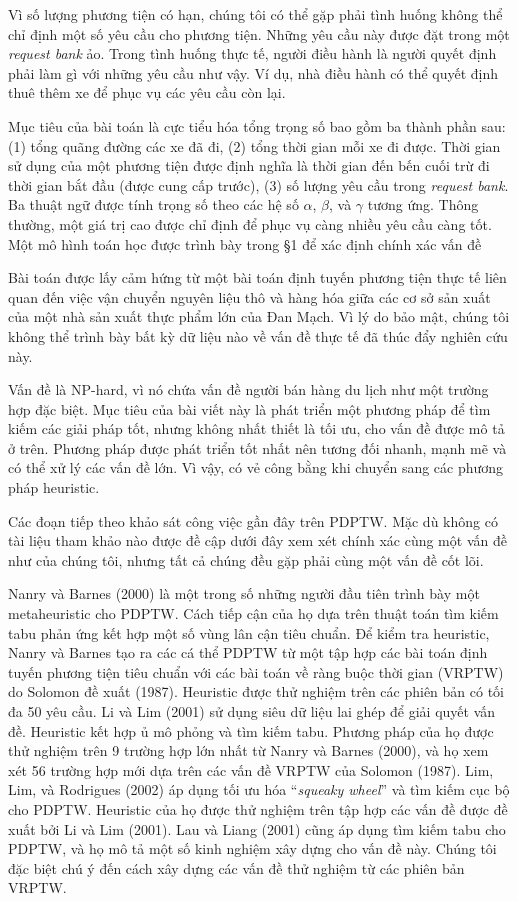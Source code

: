 Vì số lượng phương tiện có hạn, chúng tôi có thể gặp phải tình huống không thể chỉ định một số yêu cầu cho phương tiện. Những yêu cầu này được đặt trong một \textit{request bank} ảo. Trong tình huống thực tế, người điều hành là người quyết định phải làm gì với những yêu cầu như vậy. Ví dụ, nhà điều hành có thể quyết định thuê thêm xe để phục vụ các yêu cầu còn lại.

Mục tiêu của bài toán là cực tiểu hóa tổng trọng số bao gồm ba thành phần sau: (1) tổng quãng đường các xe đã đi, (2) tổng thời gian mỗi xe đi được. Thời gian sử dụng của một phương tiện được định nghĩa là thời gian đến bến cuối trừ đi thời gian bắt đầu (được cung cấp trước), (3) số lượng yêu cầu trong \textit{request bank}.
Ba thuật ngữ được tính trọng số theo các hệ số $\alpha$, $\beta$, và $\gamma$ tương ứng. Thông thường, một giá trị cao được chỉ định để phục vụ càng nhiều yêu cầu càng tốt. Một mô hình toán học được trình bày trong §1 để xác định chính xác vấn đề

Bài toán được lấy cảm hứng từ một bài toán định tuyến phương tiện thực tế liên quan đến việc vận chuyển nguyên liệu thô và hàng hóa giữa các cơ sở sản xuất của một nhà sản xuất thực phẩm lớn của Đan Mạch. Vì lý do bảo mật, chúng tôi không thể trình bày bất kỳ dữ liệu nào về vấn đề thực tế đã thúc đẩy nghiên cứu này.

Vấn đề là NP-hard, vì nó chứa vấn đề người bán hàng du lịch như một trường hợp đặc biệt. Mục tiêu của bài viết này là phát triển một phương pháp để tìm kiếm các giải pháp tốt, nhưng không nhất thiết là tối ưu, cho vấn đề được mô tả ở trên. Phương pháp được phát triển tốt nhất nên tương đối nhanh, mạnh mẽ và có thể xử lý các vấn đề lớn. Vì vậy, có vẻ công bằng khi chuyển sang các phương pháp heuristic.

Các đoạn tiếp theo khảo sát công việc gần đây trên PDPTW. Mặc dù không có tài liệu tham khảo nào được đề cập dưới đây xem xét chính xác cùng một vấn đề như của chúng tôi, nhưng tất cả chúng đều gặp phải cùng một vấn đề cốt lõi.

Nanry và Barnes (2000) là một trong số những người đầu tiên trình bày một metaheuristic cho PDPTW. Cách tiếp cận của họ dựa trên thuật toán tìm kiếm tabu phản ứng kết hợp một số vùng lân cận tiêu chuẩn. Để kiểm tra heuristic, Nanry và Barnes tạo ra các cá thể PDPTW từ một tập hợp các bài toán định tuyến phương tiện tiêu chuẩn với các bài toán về ràng buộc thời gian (VRPTW) do Solomon đề xuất (1987). Heuristic được thử nghiệm trên các phiên bản có tối đa 50 yêu cầu. Li và Lim (2001) sử dụng siêu dữ liệu lai ghép để giải quyết vấn đề. Heuristic kết hợp ủ mô phỏng và tìm kiếm tabu. Phương pháp của họ được thử nghiệm trên 9 trường hợp lớn nhất từ Nanry và Barnes (2000), và họ xem xét 56 trường hợp mới dựa trên các vấn đề VRPTW của Solomon (1987).
Lim, Lim, và Rodrigues (2002) áp dụng tối ưu hóa “\textit{squeaky wheel}” và tìm kiếm cục bộ cho PDPTW. Heuristic của họ được thử nghiệm trên tập hợp các vấn đề được đề xuất bởi Li và Lim (2001). Lau và Liang (2001) cũng áp dụng tìm kiếm tabu cho PDPTW, và họ mô tả một số kinh nghiệm xây dựng cho vấn đề này. Chúng tôi đặc biệt chú ý đến cách xây dựng các vấn đề thử nghiệm từ các phiên bản VRPTW.


